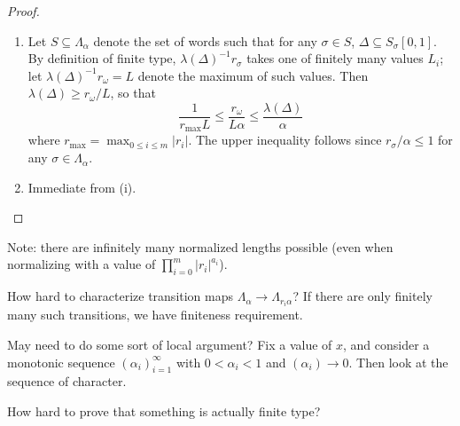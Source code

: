 \documentclass[11pt, a4paper]{memoir}
\theoremstyle{change}
\theoremstyle{plain}
\theoremstyle{nonumberplain}
\newtheorem{proof}{Proof}
\numberwithin{equation}{section}
\begin{document}
\begin{proof}
    \begin{enumerate}[nl,r]
        \item Let $S\subseteq\Lambda_\alpha$ denote the set of words such that for any $\sigma\in S$, $\Delta\subseteq S_\sigma[0,1]$.
            By definition of finite type, $\lambda(\Delta)^{-1}r_\sigma$ takes one of finitely many values $L_i$; let $\lambda(\Delta)^{-1}r_\omega=L$ denote the maximum of such values.
            Then $\lambda(\Delta)\geq r_\omega/L$, so that
            \begin{equation*}
                \frac{1}{r_{\max}L}\leq \frac{r_\omega}{L\alpha}\leq \frac{\lambda(\Delta)}{\alpha}
            \end{equation*}
            where $r_{\max}=\max_{0\leq i\leq m}|r_i|$.
            The upper inequality follows since $r_\sigma/\alpha\leq 1$ for any $\sigma\in\Lambda_\alpha$.
        \item Immediate from (i).
    \end{enumerate}
\end{proof}
Note: there are infinitely many normalized lengths possible (even when normalizing with a value of $\prod_{i=0}^m|r_i|^{a_i}$).

How hard to characterize transition maps $\Lambda_\alpha\to\Lambda_{r_i\alpha}$?
If there are only finitely many such transitions, we have finiteness requirement.

May need to do some sort of local argument?
Fix a value of $x$, and consider a monotonic sequence $(\alpha_i)_{i=1}^\infty$ with $0<\alpha_i<1$ and $(\alpha_i)\to 0$.
Then look at the sequence of character.

How hard to prove that something is actually finite type?
\end{document}
